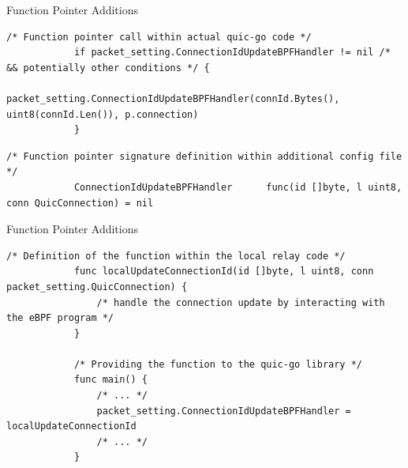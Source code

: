 \documentclass[shortpres,aspectratio=43]{beamer}
\begin{document}
\begin{frame}[fragile]{Function Pointer Additions}
    \begin{minipage}{\textwidth}
        \begin{lstlisting}[style=GoStyle,
            caption=Function-pointer addition to the quic-go library.]
            /* Function pointer call within actual quic-go code */
            if packet_setting.ConnectionIdUpdateBPFHandler != nil /* && potentially other conditions */ {
                packet_setting.ConnectionIdUpdateBPFHandler(connId.Bytes(), uint8(connId.Len()), p.connection)
            }
        \end{lstlisting}
    \end{minipage}

    \begin{minipage}{\textwidth}
        \begin{lstlisting}[style=GoStyle, caption=The signature will be defined within the library itself.]
            /* Function pointer signature definition within additional config file */
            ConnectionIdUpdateBPFHandler      func(id []byte, l uint8, conn QuicConnection) = nil
        \end{lstlisting}
    \end{minipage}
\end{frame}

\begin{frame}[fragile]{Function Pointer Additions}
    \begin{minipage}{\textwidth}
        \begin{lstlisting}[style=GoStyle, label=changes:definition-function-pointer, caption=An example of how the addition looks on the relay side.]
            /* Definition of the function within the local relay code */
            func localUpdateConnectionId(id []byte, l uint8, conn packet_setting.QuicConnection) {
                /* handle the connection update by interacting with the eBPF program */
            }   

            /* Providing the function to the quic-go library */
            func main() {
                /* ... */
                packet_setting.ConnectionIdUpdateBPFHandler = localUpdateConnectionId
                /* ... */
            }
        \end{lstlisting}
    \end{minipage}
\end{frame}
\end{document}
